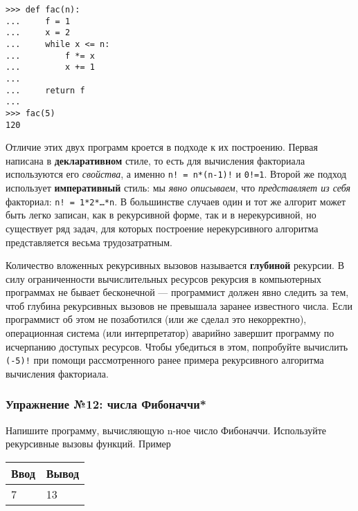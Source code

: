 \begin{verbatim}
>>> def fac(n):
...     f = 1
...     x = 2
...     while x <= n:
...         f *= x
...         x += 1
...
...     return f
...
>>> fac(5)
120
\end{verbatim}

Отличие этих двух программ кроется в подходе к их построению. Первая
написана в \textbf{декларативном} стиле, то есть для вычисления
факториала используются его \emph{свойства}, а именно
\texttt{n!\ =\ n*(n-1)!} и \texttt{0!=1}. Второй же подход использует
\textbf{императивный} стиль: мы \emph{явно описываем}, что
\emph{представляет из себя} факториал: \texttt{n!\ =\ 1*2*\ldots{}*n}. В
большинстве случаев один и тот же алгорит может быть легко записан, как
в рекурсивной форме, так и в нерекурсивной, но существует ряд задач, для
которых построение нерекурсивного алгоритма представляется весьма
трудозатратным.

Количество вложенных рекурсивных вызовов называется \textbf{глубиной}
рекурсии. В силу ограниченности вычислительных ресурсов рекурсия в
компьютерных программах не бывает бесконечной --- программист должен
явно следить за тем, чтоб глубина рекурсивных вызовов не превышала
заранее известного числа. Если программист об этом не позаботился (или
же сделал это некорректно), операционная система (или интерпретатор)
аварийно завершит программу по исчерпанию доступых ресурсов. Чтобы
убедиться в этом, попробуйте вычислить \texttt{(-5)!} при помощи
рассмотренного ранее примера рекурсивного алгоритма вычисления
факториала.

\subsubsection{Упражнение №12: числа
Фибоначчи*}\label{ux443ux43fux440ux430ux436ux43dux435ux43dux438ux435-12-ux447ux438ux441ux43bux430-ux444ux438ux431ux43eux43dux430ux447ux447ux438}

Напишите программу, вычисляющую n-ное число Фибоначчи. Используйте
рекурсивные вызовы функций. Пример

\begin{longtable}[c]{@{}ll@{}}
\toprule
\begin{minipage}[b]{0.09\columnwidth}\raggedright\strut
Ввод
\strut\end{minipage} &
\begin{minipage}[b]{0.10\columnwidth}\raggedright\strut
Вывод
\strut\end{minipage}\tabularnewline
\midrule
\endhead
\begin{minipage}[t]{0.09\columnwidth}\raggedright\strut
7
\strut\end{minipage} &
\begin{minipage}[t]{0.10\columnwidth}\raggedright\strut
13
\strut\end{minipage}\tabularnewline
\bottomrule
\end{longtable}

